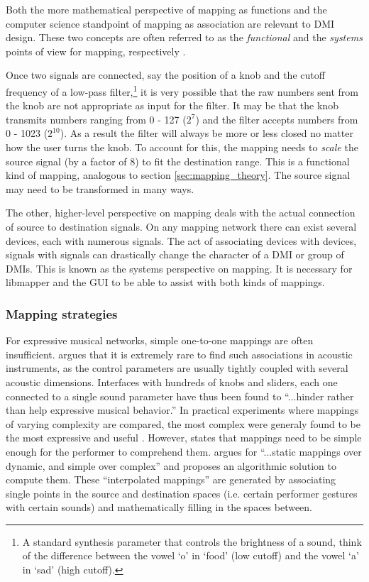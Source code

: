 Both the more mathematical perspective of mapping as functions and the computer science standpoint of mapping as association are relevant to DMI design. These two concepts are often referred to as the \emph{functional} and the \emph{systems} points of view for mapping, respectively \cite{two_types_of_mapping}. 

Once two signals are connected, say the position of a knob and the cutoff frequency of a low-pass filter,\footnote{A standard synthesis parameter that controls the brightness of a sound, think of the difference between the vowel `o' in `food' (low cutoff) and the vowel `a' in `sad' (high cutoff).} it is very possible that the raw numbers sent from the knob are not appropriate as input for the filter. It may be that the knob transmits numbers ranging from 0 - 127 ($2^7$) and the filter accepts numbers from 0 - 1023 ($2^{10}$). As a result the filter will always be more or less closed no matter how the user turns the knob. To account for this, the mapping needs to \emph{scale} the source signal (by a factor of 8) to fit the destination range. This is a functional kind of mapping, analogous to section \ref{sec:mapping_theory}. The source signal may need to be transformed in many ways. 

The other, higher-level perspective on mapping deals with the actual connection of source to destination signals. On any mapping network there can exist several devices, each with numerous signals. The act of associating devices with devices, signals with signals can drastically change the character of a DMI or group of DMIs. This is known as the systems perspective on mapping. It is necessary for libmapper and the GUI to be able to assist with both kinds of mappings.

	\subsubsection{Mapping strategies}

For expressive musical networks, simple one-to-one mappings are often insufficient.   argues that it is extremely rare to find such associations in acoustic instruments, as the control parameters are usually tightly coupled with several acoustic dimensions. Interfaces with hundreds of knobs and sliders, each one connected to a single sound parameter have thus been found to ``...hinder rather than help expressive musical behavior.''  In practical experiments where mappings of varying complexity are compared, the most complex were generaly found to be the most expressive and useful \cite{mapping_complexity_experiments}. However,  states that mappings need to be simple enough for the performer to comprehend them.  argues for ``...static mappings over dynamic, and simple over complex'' and proposes an algorithmic solution to compute them. These ``interpolated mappings'' are generated by associating single points in the source and destination spaces (i.e. certain performer gestures with certain sounds) and mathematically filling in the spaces between.


